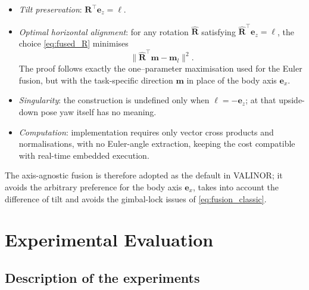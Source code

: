 \documentclass{IJCAS}
\begin{document}
\begin{itemize}
  \item \emph{Tilt preservation}:  
        \(\boldsymbol{R}^{\top}\boldsymbol{e}_{z}=\boldsymbol{\ell}\).

  \item \emph{Optimal horizontal alignment}:  
        for any rotation \(\hat{\boldsymbol{R}}\) satisfying
        \(\hat{\boldsymbol{R}}^{\top}\boldsymbol{e}_{z}=\boldsymbol{\ell}\),
        the choice \eqref{eq:fused_R} minimises
        \[
          \bigl\|
             \hat{\boldsymbol{R}}^{\top}\boldsymbol{m}-\boldsymbol{m}_{l}
          \bigr\|^{2}.
        \]
        The proof follows exactly the one–parameter maximisation used
        for the Euler fusion, but with the task-specific direction
        \(\boldsymbol{m}\) in place of the body axis
        \(\boldsymbol{e}_{x}\).

  \item \emph{Singularity}:  
        the construction is undefined only when
        \(\boldsymbol{\ell}=-\boldsymbol{e}_{z}\); at that upside-down
        pose yaw itself has no meaning.

  \item \emph{Computation}:  
        implementation requires only vector cross products and
        normalisations, with no Euler-angle extraction, keeping the cost
        compatible with real-time embedded execution.
\end{itemize}

The axis-agnostic fusion is therefore adopted as the default in {\scshape VALINOR}; it avoids the arbitrary preference for the body axis \(\boldsymbol{e}_{x}\), takes into account the difference of tilt and avoids the gimbal-lock issues of \eqref{eq:fusion_classic}. 





\section{Experimental Evaluation}
\subsection{Description of the experiments}
\end{document}
